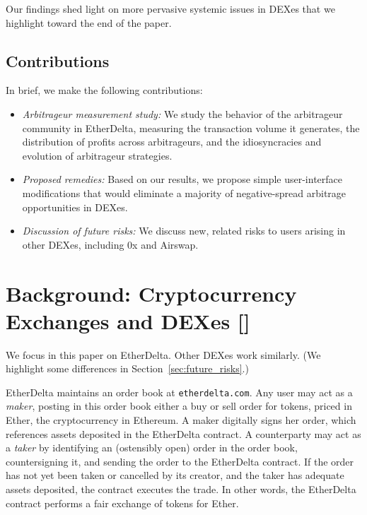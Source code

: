 \documentclass[conference]{IEEEtran}
\begin{document}
Our findings shed light on more pervasive systemic issues in DEXes that we highlight toward the end of the paper.

\subsection{Contributions}

In brief, we make the following contributions:

\begin{itemize}
    \item {\em Arbitrageur measurement study:} We study the behavior of the arbitrageur community in EtherDelta, measuring the transaction volume it generates, the distribution of profits across arbitrageurs, and the idiosyncracies and evolution of arbitrageur strategies. 
    \item {\em Proposed remedies:} Based on our results, we propose simple user-interface modifications that would eliminate a majority of negative-spread arbitrage opportunities in DEXes.
    \item {\em Discussion of future risks:} We discuss new, related risks to users arising in other DEXes, including 0x and Airswap.
\end{itemize}





\section{Background: Cryptocurrency Exchanges and DEXes [\color{red}{Iddo}]}
\label{sec:DEXes}

We focus in this paper on EtherDelta. Other DEXes work similarly. (We highlight some differences in Section~\ref{sec:future_risks}.)

EtherDelta maintains an order book at {\tt etherdelta.com}. Any user may act as a {\em maker}, posting in this order book either a buy or sell order for tokens, priced in Ether, the cryptocurrency in Ethereum. A maker digitally signs her order, which references assets deposited in the EtherDelta contract. A counterparty may act as a {\em taker} by identifying an (ostensibly open) order in the order book, countersigning it, and sending the order to the EtherDelta contract. If the order has not yet been taken or cancelled by its creator, and the taker has adequate assets deposited, the contract executes the trade. In other words, the EtherDelta contract performs a fair exchange of tokens for Ether.  
\end{document}
